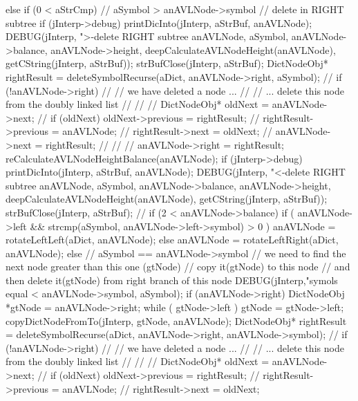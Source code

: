 {{{    }
  } else if (0 < aStrCmp) {
    // aSymbol > anAVLNode->symbol // delete in RIGHT subtree
    if (jInterp->debug) {
      printDicInto(jInterp, aStrBuf, anAVLNode);
      DEBUG(jInterp, ">-delete RIGHT subtree %
          anAVLNode, aSymbol, anAVLNode->balance,
          anAVLNode->height, deepCalculateAVLNodeHeight(anAVLNode),
          getCString(jInterp, aStrBuf));
      strBufClose(jInterp, aStrBuf);
    }
    DictNodeObj* rightResult =
      deleteSymbolRecurse(aDict, anAVLNode->right, aSymbol);
//    if (!anAVLNode->right) {
//      // we have deleted a node ...
//      // ... delete this node from the doubly linked list
//      //
//      DictNodeObj* oldNext           = anAVLNode->next;
//      if (oldNext) oldNext->previous = rightResult;
//      rightResult->previous          = anAVLNode;
//      rightResult->next              = oldNext;
//      anAVLNode->next                = rightResult;
//      //
//    }
    anAVLNode->right = rightResult;
    reCalculateAVLNodeHeightBalance(anAVLNode);
    if (jInterp->debug) {
      printDicInto(jInterp, aStrBuf, anAVLNode);
      DEBUG(jInterp, "<-delete RIGHT subtree %
          anAVLNode, aSymbol, anAVLNode->balance,
          anAVLNode->height, deepCalculateAVLNodeHeight(anAVLNode),
          getCString(jInterp, aStrBuf));
      strBufClose(jInterp, aStrBuf);
    }
    //
    if (2 < anAVLNode->balance) {
      if (
        anAVLNode->left &&
        strcmp(aSymbol, anAVLNode->left->symbol) > 0
      ) {
        anAVLNode = rotateLeftLeft(aDict, anAVLNode);
      } else {
        anAVLNode = rotateLeftRight(aDict, anAVLNode);
      }
    }
  } else {
    // aSymbol == anAVLNode->symbol
    // we need to find the next node greater than this one (gtNode)
    // copy it(gtNode) to this node
    // and then delete it(gtNode) from right branch of this node
    DEBUG(jInterp,"symols equal <%
          anAVLNode->symbol, aSymbol);
    if (anAVLNode->right) {
      DictNodeObj *gtNode = anAVLNode->right;
      while ( gtNode->left ) {
        gtNode = gtNode->left;
      }
      copyDictNodeFromTo(jInterp, gtNode, anAVLNode);
      DictNodeObj* rightResult =
        deleteSymbolRecurse(aDict, anAVLNode->right, anAVLNode->symbol);
//     if (!anAVLNode->right) {
//        // we have deleted a node ...
//        // ... delete this node from the doubly linked list
//        //
//        DictNodeObj* oldNext           = anAVLNode->next;
//        if (oldNext) oldNext->previous = rightResult;
//        rightResult->previous          = anAVLNode;
//        rightResult->next              = oldNext;
}}}}
